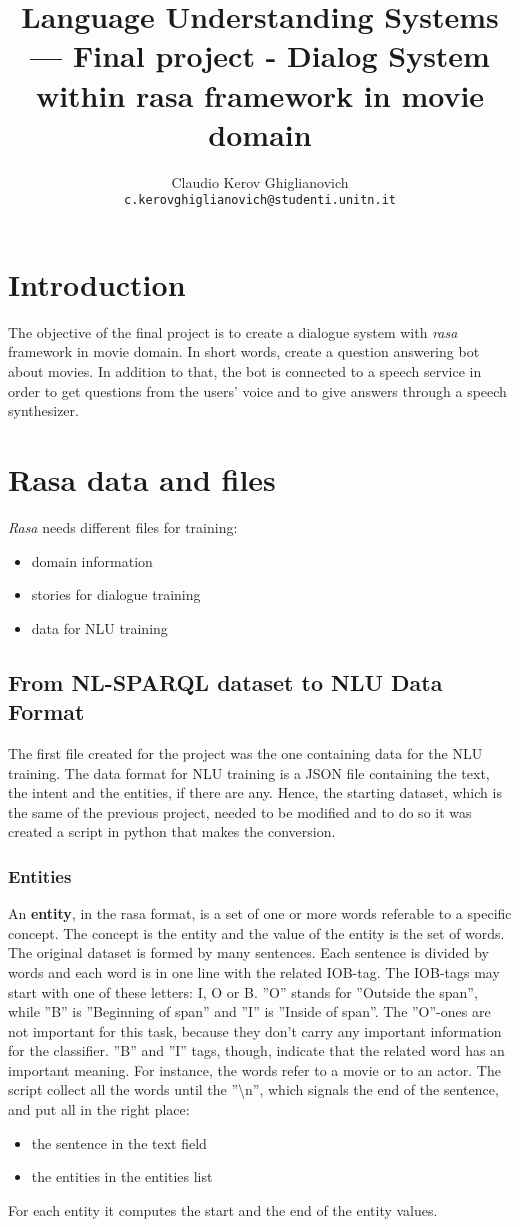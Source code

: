 \documentclass[11pt,a4paper]{article}
\title{Language Understanding Systems --- Final project - 
Dialog System within rasa framework in movie domain}
\author{Claudio Kerov Ghiglianovich \\
  {\tt c.kerovghiglianovich@studenti.unitn.it}}
\date{}
\begin{document}
\maketitle


\section{Introduction}
The objective of the final project is to create a dialogue system with \textit{rasa} framework in movie domain. In short words, create a question answering bot about movies. In addition to that, the bot is connected to a speech service in order to get questions from the users' voice and to give answers through a speech synthesizer.

\section{Rasa data and files}
\textit{Rasa} needs different files for training:
\begin{itemize}
	\item domain information
	\item stories for dialogue training
	\item data for NLU training
\end{itemize}
\subsection{From NL-SPARQL dataset to NLU Data Format}
The first file created for the project was the one containing data for the NLU training. The data format for NLU training is a JSON file containing the text, the intent and the entities, if there are any. Hence, the starting dataset, which is the same of the previous project, needed to be modified and to do so it was created a script in python that makes the conversion. 
\subsubsection{Entities}
An \textbf{entity}, in the rasa format, is a set of one or more words referable to a specific concept. The concept is the entity and the value of the entity is the set of words. 
The original dataset is formed by many sentences. Each sentence is divided by words and each word is in one line with the related IOB-tag. The IOB-tags may start with one of these letters: I, O or B. ''O'' stands for ''Outside the span'', while ''B'' is ''Beginning of span'' and ''I'' is ''Inside of span''. The ''O''-ones are not important for this task, because they don't carry any important information for the classifier. ''B'' and ''I'' tags, though, indicate that the related word has an important meaning. For instance, the words refer to a movie or to an actor. The script collect all the words until the ''\textbackslash n'', which signals the end of the sentence, and put all in the right place:
\begin{itemize}
	\item the sentence in the text field
	\item the entities in the entities list
\end{itemize}
For each entity it computes the start and the end of the entity values.
\end{document}
